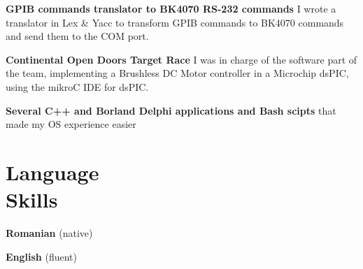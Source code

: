\documentclass[margin,line,a4paper]{resume}
\begin{document}
\begin{resume}
	\textbf{GPIB commands translator to BK4070 RS-232 commands} I wrote a translator in Lex \& Yacc to transform GPIB commands to BK4070 commands and send them to the COM port.
	
	\textbf{Continental Open Doors Target Race} I was in charge of the software part of the team, implementing a Brushless DC Motor controller in a Microchip dsPIC, using the mikroC IDE for dsPIC.
	
	\textbf{Several C++ and Borland Delphi applications and Bash scipts} that made my OS experience easier
	
\section{\mysidestyle Language\\Skills}
	\textbf{Romanian} (native)
	
	\textbf{English} (fluent)
\end{resume}
\end{document}
